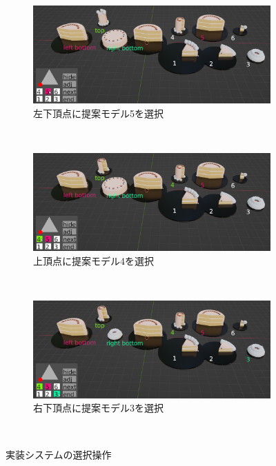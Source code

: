 \begin{figure}
  \centering
  \begin{subfigure}{1\linewidth}
    \centering
    \includegraphics[scale=0.33]{./imgs/systemUse/select1.png}
    \caption{左下頂点に提案モデル5を選択}\label{fig:sOV_select1}
  \end{subfigure}\\
  \begin{subfigure}{1\linewidth}
    \centering
    \includegraphics[scale=0.33]{./imgs/systemUse/select2.png}
    \caption{上頂点に提案モデル4を選択}\label{fig:sOV_select2}
  \end{subfigure}\\
  \begin{subfigure}{1\linewidth}
    \centering
    \includegraphics[scale=0.33]{./imgs/systemUse/select3.png}
    \caption{右下頂点に提案モデル3を選択}\label{fig:sOV_select3}
  \end{subfigure}\\
  \caption{実装システムの選択操作}\label{fig:systemOverViewSelect}
\end{figure}

